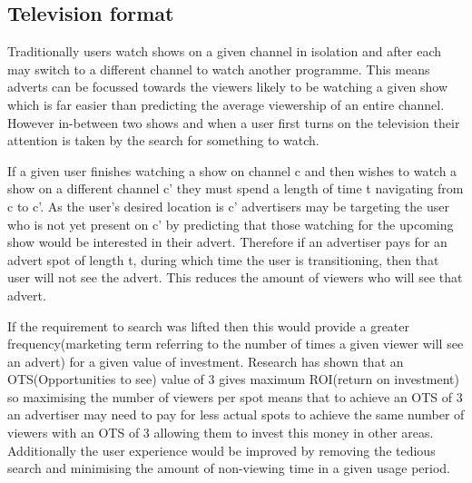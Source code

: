 \subsection{Television format}
Traditionally users watch shows on a given channel in isolation and after each may switch to a different channel to watch another programme. This means adverts can be focussed towards the viewers likely to be watching a given show which is far easier than predicting the average viewership of an entire channel. However in-between two shows and when a user first turns on the television their attention is taken by the search for something to watch.

If a given user finishes watching a show on channel c and then wishes to watch a show on a different channel c' they must spend a length of time t navigating from c to c'. As the user's desired location is c' advertisers may be targeting the user who is not yet present on c' by predicting that those watching for the upcoming show would be interested in their advert. Therefore if an advertiser pays for an advert spot of length t, during which time the user is transitioning, then that user will not see the advert. This reduces the amount of viewers who will see that advert.

If the requirement to search was lifted then this would provide a greater frequency(marketing term referring to the number of times a given viewer will see an advert) for a given value of investment. Research has shown that an OTS(Opportunities to see) value of 3 gives maximum ROI(return on investment) so maximising the number of viewers per spot means that to achieve an OTS of 3 an advertiser may need to pay for less actual spots to achieve the same number of viewers with an OTS of 3 allowing them to invest this money in other areas. Additionally the user experience would be improved by removing the tedious search and minimising the amount of non-viewing time in a given usage period.

